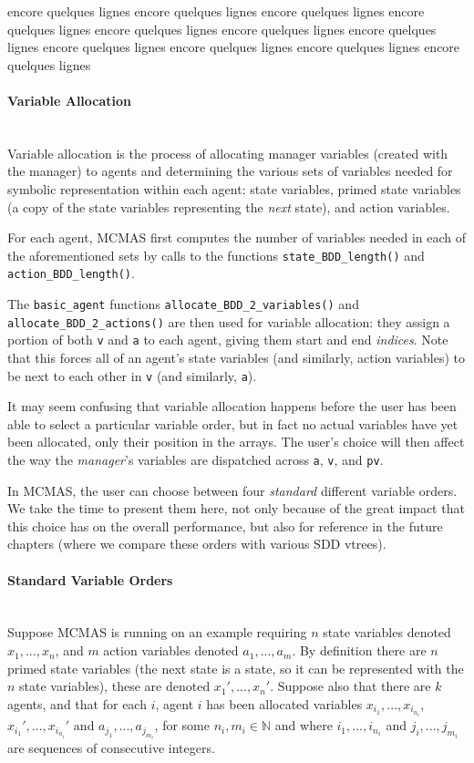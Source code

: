\documentclass[12]{article}
\newcommand{\myparagraph}[1]{\paragraph{#1}\mbox{}\\}
\begin{document}
encore quelques lignes
encore quelques lignes
encore quelques lignes
encore quelques lignes
encore quelques lignes
encore quelques lignes
encore quelques lignes
encore quelques lignes
encore quelques lignes
encore quelques lignes
encore quelques lignes

\myparagraph{Variable Allocation}

Variable allocation is the process of allocating manager variables (created with the manager) to agents and determining the various sets of variables needed for symbolic representation within each agent: state variables, primed state variables (a copy of the state variables representing the \textit{next }state), and action variables.

For each agent, MCMAS first computes the number of variables needed in each of the aforementioned sets by calls to the functions \texttt{state\_BDD\_length()} and \texttt{action\_BDD\_length()}.

The \texttt{basic\_agent} functions \texttt{allocate\_BDD\_2\_variables()} and \texttt{allocate\_BDD\_2\_actions()} are then used for variable allocation: they assign a portion of both \texttt{v} and \texttt{a} to each agent, giving them start and end \textit{indices}. Note that this forces all of an agent's state variables (and similarly, action variables) to be next to each other in \texttt{v} (and similarly, \texttt{a}). 

It may seem confusing that variable allocation happens before the user has been able to select a particular variable order, but in fact no actual variables have yet been allocated, only their position in the arrays. The user's choice will then affect the way the \textit{manager}'s variables are dispatched across \texttt{a}, \texttt{v}, and \texttt{pv}. 

In MCMAS, the user can choose between four \textit{standard} different variable orders. We take the time to present them here, not only because of the great impact that this choice has on the overall performance, but also for reference in the future chapters (where we compare these orders with various SDD vtrees).

\myparagraph{Standard Variable Orders}
 
Suppose MCMAS is running on an example requiring $n$ state variables denoted $x_1, ..., x_n$, and $m$ action variables denoted $a_1, ..., a_m$. By definition there are $n$ primed state variables (the next state is a state, so it can be represented with the $n$ state variables), these are denoted $x_1', ..., x_n'$. 
Suppose also that there are $k$ agents, and that for each $i$, agent $i$ has been allocated variables $x_{i_1}, ..., x_{i_{n_i}}$, $x_{i_1}', ..., x_{i_{n_i}}'$ and $a_{j_1}, ..., a_{j_{m_i}}$, for some $n_i, m_i \in \mathbb{N}$ and where $i_1, ..., i_{n_i}$ and $j_i, ..., j_{m_i}$ are sequences of consecutive integers.
\end{document}
